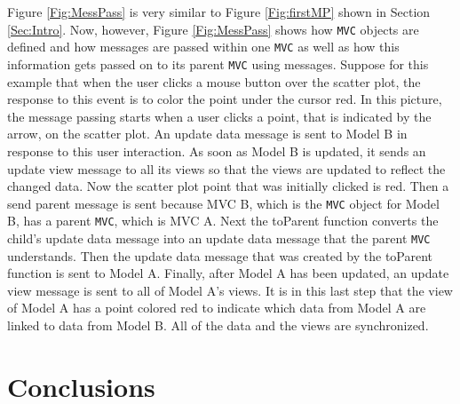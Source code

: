 \documentclass[11pt]{article}
\newcommand{\Rfunction}[1]{{\textsf{#1}}}
\newcommand{\Robject}[1]{{\texttt{#1}}}
\begin{document}
Figure \ref{Fig:MessPass} is very similar to Figure \ref{Fig:firstMP} shown in
Section \ref{Sec:Intro}.  Now, however, Figure \ref{Fig:MessPass} shows how
\Robject{MVC} objects are defined and how messages are passed within one
\Robject{MVC} as well as how this information gets passed on to its parent
\Robject{MVC} using messages.  Suppose for this example that when the user
clicks a mouse button over the scatter plot, the response to this event is to
color the point under the cursor 
red.  In this picture, the message passing starts when a user clicks a point,
that is indicated by the arrow, on the scatter plot.  An update data message is
sent to Model B in response to this user interaction.  As soon as Model B is
updated, it sends an update view message to all its views so that the views
are updated to reflect the changed data.  Now the scatter plot point that was
initially clicked is red.  Then a send parent message is sent because MVC
B, which is the \Robject{MVC} object for Model B, has a parent \Robject{MVC},
which is MVC A.  Next the \Rfunction{toParent} function converts the child's
update data message into an update data message that the parent \Robject{MVC}
understands.  Then the update data message that was created by the
\Rfunction{toParent} function is sent to Model A.  Finally, after Model A has
been updated, an update view message is sent to all of Model A's views.  It is
in this last step that the view of Model A has a point colored red to indicate
which data from Model A are linked to data from Model B.  All of the data and
the views are synchronized. 

\section{Conclusions}\label{Sec:Conc}


\end{document}
